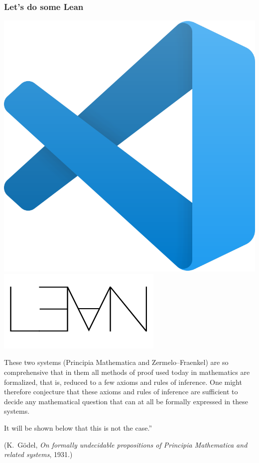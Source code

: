 \documentclass[10pt]{beamer}
\begin{document}
\begin{frame}
\frametitle{Let's do some Lean}
\includegraphics[scale=.15]{vscode_logo.png}\hspace{1cm}\includegraphics[trim=0 -1.45cm 5cm 5cm, scale=.5]{lean_logo.png}
\end{frame}
\begin{frame}
These two systems ({\color{arancio}Principia Mathematica and Zermelo--Fraenkel}) are so comprehensive that in them all methods of proof used today in mathematics are formalized, that is, reduced to a few axioms and rules of inference. One might therefore conjecture that these axioms and rules of inference are sufficient to decide any mathematical question that can at all be formally expressed in these systems.   
\pause

It will be shown below that this is not the case.''

\vspace{.25cm}

(K.~Gödel, \emph{ On formally undecidable propositions of Principia
Mathematica and related systems}, 1931.)
\end{frame}
\end{document}
